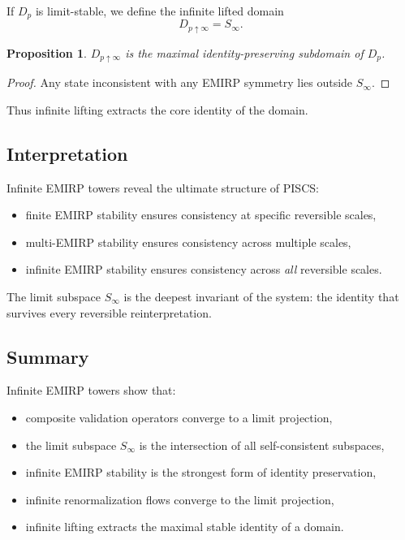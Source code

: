 \documentclass[11pt]{article}
\theoremstyle{definition}
\theoremstyle{plain}
\newtheorem{proposition}[definition]{Proposition}
\theoremstyle{remark}
\begin{document}
If $D_p$ is limit-stable, we define the infinite lifted domain
\[
D_{p \uparrow \infty} = S_\infty.
\]

\begin{proposition}
$D_{p \uparrow \infty}$ is the maximal identity-preserving subdomain of
$D_p$.
\end{proposition}

\begin{proof}
Any state inconsistent with any EMIRP symmetry lies outside $S_\infty$.
\end{proof}

Thus infinite lifting extracts the core identity of the domain.

\subsection{Interpretation}

Infinite EMIRP towers reveal the ultimate structure of PISCS:

\begin{itemize}
    \item finite EMIRP stability ensures consistency at specific reversible scales,
    \item multi-EMIRP stability ensures consistency across multiple scales,
    \item infinite EMIRP stability ensures consistency across \emph{all} reversible scales.
\end{itemize}

The limit subspace $S_\infty$ is the deepest invariant of the system:
the identity that survives every reversible reinterpretation.

\subsection{Summary}

Infinite EMIRP towers show that:

\begin{itemize}
    \item composite validation operators converge to a limit projection,
    \item the limit subspace $S_\infty$ is the intersection of all
    self-consistent subspaces,
    \item infinite EMIRP stability is the strongest form of identity
    preservation,
    \item infinite renormalization flows converge to the limit projection,
    \item infinite lifting extracts the maximal stable identity of a domain.
\end{itemize}
\end{document}
